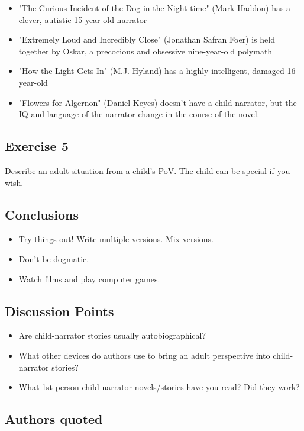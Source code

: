 \documentclass[11pt]{article}
\newenvironment{narrow}[2]{%
 \begin{list}{}{%
  \setlength{\topsep}{0pt}%
  \setlength{\leftmargin}{#1}%
  \setlength{\rightmargin}{#2}%
  \setlength{\listparindent}{\parindent}%
  \setlength{\itemindent}{\parindent}%
  \setlength{\parsep}{\parskip}%
 }%
\item[]}{\end{list}}
\begin{document}
\begin{itemize}
\item "The Curious Incident of the Dog in the Night-time" (Mark
  Haddon) has a clever, 
  autistic 15-year-old narrator
\item "Extremely Loud and Incredibly Close" (Jonathan Safran Foer) 
 is held together by Oskar, a precocious and obsessive nine-year-old
 polymath
\item "How the Light Gets In" (M.J. Hyland) has a highly intelligent,
  damaged 16-year-old
\item "Flowers for Algernon" (Daniel Keyes) doesn't have a child
      narrator, but the IQ and language of the narrator change in the
      course
of the novel.
\end{itemize}
\subsection*{Exercise 5}
\begin{narrow}{1.0cm}{1.0cm}

Describe an adult situation from a child's PoV. The child can be special if you wish.
\end{narrow}



\subsection*{Conclusions}
\begin{itemize}
\item Try things out! Write multiple versions. Mix versions.
\item Don't be dogmatic.
\item Watch films and play computer games.
\end{itemize}

\subsection*{Discussion Points}
\begin{itemize}
\item Are child-narrator stories usually autobiographical?
\item What other devices do authors use to bring an adult perspective into child-narrator stories?
\item What 1st person child narrator novels/stories have you read? Did they work?
\end{itemize}


\subsection*{Authors quoted}
\end{document}
